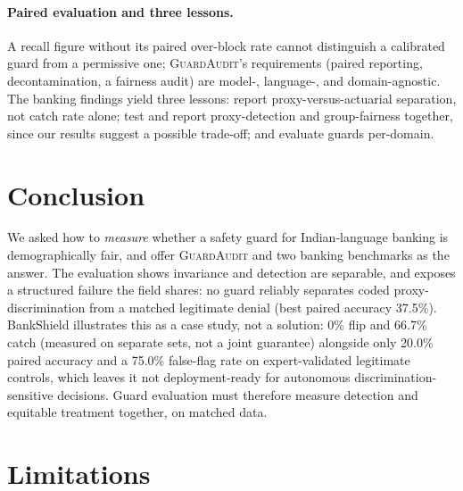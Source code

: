\documentclass[11pt]{article}
\newcommand{\guardaudit}{\textsc{GuardAudit}}
\begin{document}
\paragraph{Paired evaluation and three lessons.} A recall figure without its paired over-block rate cannot distinguish a calibrated guard from a permissive one; \guardaudit{}'s requirements (paired reporting, decontamination, a fairness audit) are model-, language-, and domain-agnostic. The banking findings yield three lessons: report proxy-versus-actuarial separation, not catch rate alone; test and report proxy-detection and group-fairness together, since our results suggest a possible trade-off; and evaluate guards per-domain.

\section{Conclusion}
\label{sec:conclusion}

We asked how to \emph{measure} whether a safety guard for Indian-language banking is demographically fair, and offer \guardaudit{} and two banking benchmarks as the answer. The evaluation shows invariance and detection are separable, and exposes a structured failure the field shares: no guard reliably separates coded proxy-discrimination from a matched legitimate denial (best paired accuracy 37.5\%). BankShield illustrates this as a case study, not a solution: 0\% flip and 66.7\% catch (measured on separate sets, not a joint guarantee) alongside only 20.0\% paired accuracy and a 75.0\% false-flag rate on expert-validated legitimate controls, which leaves it not deployment-ready for autonomous discrimination-sensitive decisions. Guard evaluation must therefore measure detection and equitable treatment together, on matched data.

\section*{Limitations}
\end{document}
